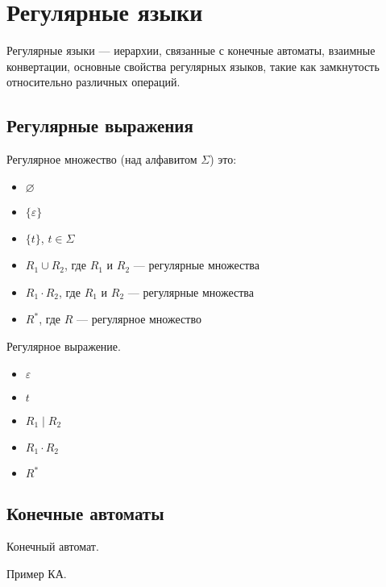 \chapter{Регулярные языки}


Регулярные языки --- иерархии, связанные с конечные автоматы, взаимные конвертации, основные свойства регулярных языков, такие как замкнутость относительно различных операций.


\section{Регулярные выражения}

\begin{definition}
    Регулярное множество (над алфавитом $\Sigma$) это:
    \begin{itemize}
        \item $\varnothing$
        \item $\{\varepsilon\}$
        \item $\{t\}$, $t \in \Sigma$
        \item $R_1 \cup R_2$, где $R_1$ и $R_2$ --- регулярные множества
        \item $R_1 \cdot R_2$, где $R_1$ и $R_2$ --- регулярные множества
        \item $R^*$, где $R$ --- регулярное множество
    \end{itemize}
\end{definition}


\begin{definition}
    Регулярное выражение.
    \begin{itemize}
        \item $\varepsilon$
        \item $t$
        \item $R_1 \mid R_2$
        \item $R_1 \cdot R_2$
        \item $R^*$
    \end{itemize}
\end{definition}

\section{Конечные автоматы}

\begin{definition}
    Конечный автомат.
\end{definition}

Пример КА.

